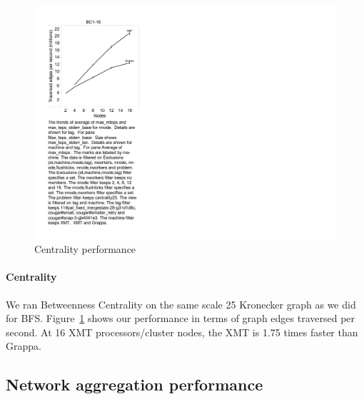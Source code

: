 \begin{figure}[tH]
\begin{center}
  \includegraphics[width=0.95\columnwidth]{figs/centrality_performance}
\begin{minipage}{0.95\columnwidth}
  \caption{\label{fig:centrality-performance} Centrality performance}
\end{minipage}
\vspace{-3ex}
\end{center}
\end{figure}

\paragraph{Centrality}

We ran Betweenness Centrality on the same scale 25 Kronecker graph as
we did for BFS. Figure~\ref{fig:centrality-performance} shows our
performance in terms of graph edges traversed per second. At 16 XMT
processors/cluster nodes, the XMT is 1.75 times faster than Grappa.

\subsection{Network aggregation performance}



